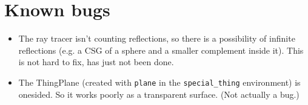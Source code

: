 
\section{Known bugs}




	\begin{itemize}
		\item The ray tracer isn't counting reflections, so there is a possibility of infinite reflections (e.g. a CSG of a sphere and a smaller complement inside it). This is not hard to fix, has just not been done.
		\item The ThingPlane (created with \texttt{plane} in the \texttt{special\_thing} environment) is onesided. So it works poorly as a transparent surface. (Not actually a bug.)
	\end{itemize}
